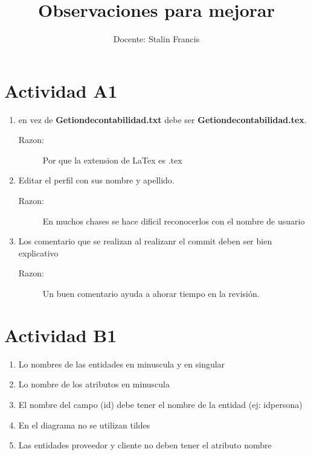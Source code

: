 \documentclass{article}
\title{Observaciones para mejorar}
\author{Docente: Stalin Francis}
\begin{document}
\maketitle
\section{Actividad A1}
\begin{enumerate}
\item en vez de \textbf{Getiondecontabilidad.txt}  debe ser \textbf{Getiondecontabilidad.tex}.
\begin{description}
\item[Razon:] Por que la extension de LaTex es .tex
\end{description}
\item Editar el perfil con sus nombre y apellido.
\begin{description}
\item[Razon:] En muchos chases se hace dificil reconocerlos con el nombre de usuario
\end{description}
\item Los comentario que se realizan al realizanr el commit deben ser bien explicativo
\begin{description}
\item[Razon:] Un buen comentario ayuda a ahorar tiempo en la revisión.
\end{description}
\end{enumerate}

\section{Actividad B1}
\begin{enumerate}
\item{Lo nombres de las entidades en minuscula y en singular}
\item{Lo nombre de los atributos en minuscula}
\item{El nombre del campo (id) debe tener el nombre de la entidad (ej: idpersona)}
\item{En el diagrama no se utilizan tildes}
\item{Las entidades proveedor y cliente no deben tener el atributo nombre}
\end{enumerate}
\end{document}
